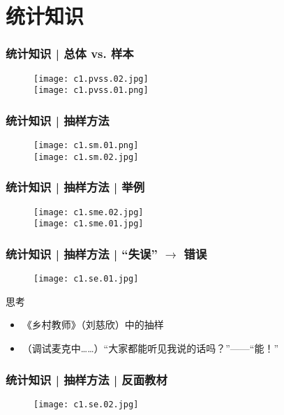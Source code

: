 \section{统计知识}
\begin{frame}
  \frametitle{统计知识 | 总体 vs. 样本}
  \begin{figure}
    \centering
    \texttt{[image: c1.pvss.02.jpg]}\\
    \vspace{0.5em}
    \texttt{[image: c1.pvss.01.png]}
  \end{figure}
\end{frame}

\begin{frame}
  \frametitle{统计知识 | 抽样方法}
  \begin{figure}
    \centering
    \texttt{[image: c1.sm.01.png]}\\
    \vspace{0.5em}
    \texttt{[image: c1.sm.02.jpg]}
  \end{figure}
\end{frame}

\begin{frame}
  \frametitle{统计知识 | 抽样方法 | 举例}
  \begin{figure}
    \centering
    \texttt{[image: c1.sme.02.jpg]}\\
    \vspace{0.5em}
    \texttt{[image: c1.sme.01.jpg]}
  \end{figure}
\end{frame}

\begin{frame}
  \frametitle{统计知识 | 抽样方法 | “失误” $\rightarrow$ 错误}
  \begin{figure}
    \centering
    \texttt{[image: c1.se.01.jpg]}
  \end{figure}
  \pause
  \begin{block}{思考}
    \begin{itemize}
      \item 《乡村教师》（刘慈欣）中的抽样
      \item （调试麦克中……）“大家都能听见我说的话吗？”——“能！”
    \end{itemize}
  \end{block}
\end{frame}

\begin{frame}
  \frametitle{统计知识 | 抽样方法 | 反面教材}
  \begin{figure}
    \centering
    \texttt{[image: c1.se.02.jpg]}
  \end{figure}
\end{frame}

